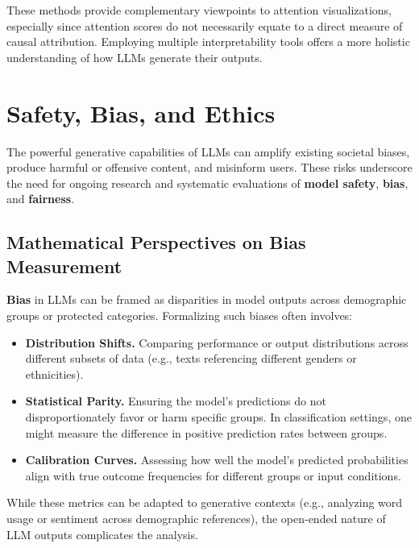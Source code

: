 \noindent
These methods provide complementary viewpoints to attention visualizations, especially since attention scores do not necessarily equate to a direct measure of causal attribution. Employing multiple interpretability tools offers a more holistic understanding of how LLMs generate their outputs.


\section{Safety, Bias, and Ethics}
\label{sec:safety_bias_ethics}

\noindent
The powerful generative capabilities of LLMs can amplify existing societal biases, produce harmful or offensive content, and misinform users. These risks underscore the need for ongoing research and systematic evaluations of \textbf{model safety}, \textbf{bias}, and \textbf{fairness}.

\subsection{Mathematical Perspectives on Bias Measurement}
\noindent
\textbf{Bias} in LLMs can be framed as disparities in model outputs across demographic groups or protected categories. Formalizing such biases often involves:
\begin{itemize}
    \item \textbf{Distribution Shifts.} Comparing performance or output distributions across different subsets of data (e.g., texts referencing different genders or ethnicities).
    \item \textbf{Statistical Parity.} Ensuring the model's predictions do not disproportionately favor or harm specific groups. In classification settings, one might measure the difference in positive prediction rates between groups.
    \item \textbf{Calibration Curves.} Assessing how well the model's predicted probabilities align with true outcome frequencies for different groups or input conditions.
\end{itemize}
While these metrics can be adapted to generative contexts (e.g., analyzing word usage or sentiment across demographic references), the open-ended nature of LLM outputs complicates the analysis.


